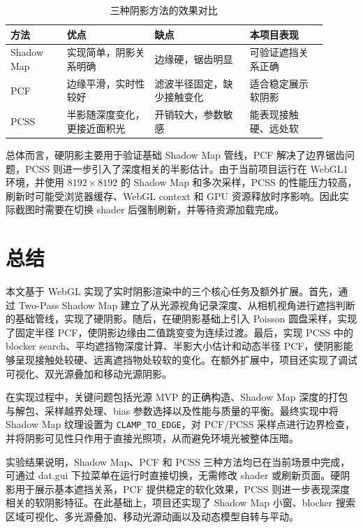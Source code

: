\documentclass{sjtuarticle}
\begin{document}
\begin{table}[htbp]
\centering
\caption{三种阴影方法的效果对比}
\begin{tabular}{p{0.16\linewidth}p{0.25\linewidth}p{0.27\linewidth}p{0.22\linewidth}}
\toprule
方法 & 优点 & 缺点 & 本项目表现 \\
\midrule
Shadow Map & 实现简单，阴影关系明确 & 边缘硬，锯齿明显 & 可验证遮挡关系正确 \\
PCF & 边缘平滑，实时性较好 & 滤波半径固定，缺少接触变化 & 适合稳定展示软阴影 \\
PCSS & 半影随深度变化，更接近面积光 & 开销较大，参数敏感 & 能表现接触硬、远处软 \\
\bottomrule
\end{tabular}
\end{table}

总体而言，硬阴影主要用于验证基础 Shadow Map 管线，PCF 解决了边界锯齿问题，PCSS 则进一步引入了深度相关的半影估计。由于当前项目运行在 WebGL1 环境，并使用 \(8192 \times 8192\) 的 Shadow Map 和多次采样，PCSS 的性能压力较高，刷新时可能受浏览器缓存、WebGL context 和 GPU 资源释放时序影响。因此实际截图时需要在切换 shader 后强制刷新，并等待资源加载完成。

\section{总结}

本文基于 WebGL 实现了实时阴影渲染中的三个核心任务及额外扩展。首先，通过 Two-Pass Shadow Map 建立了从光源视角记录深度、从相机视角进行遮挡判断的基础管线，实现了硬阴影。随后，在硬阴影基础上引入 Poisson 圆盘采样，实现了固定半径 PCF，使阴影边缘由二值跳变变为连续过渡。最后，实现 PCSS 中的 blocker search、平均遮挡物深度计算、半影大小估计和动态半径 PCF，使阴影能够呈现接触处较硬、远离遮挡物处较软的变化。在额外扩展中，项目还实现了调试可视化、双光源叠加和移动光源阴影。

在实现过程中，关键问题包括光源 MVP 的正确构造、Shadow Map 深度的打包与解包、采样越界处理、bias 参数选择以及性能与质量的平衡。最终实现中将 Shadow Map 纹理设置为 \texttt{CLAMP\_TO\_EDGE}，对 PCF/PCSS 采样点进行边界检查，并将阴影可见性只作用于直接光照项，从而避免环境光被整体压暗。

实验结果说明，Shadow Map、PCF 和 PCSS 三种方法均已在当前场景中完成，可通过 dat.gui 下拉菜单在运行时直接切换，无需修改 shader 或刷新页面。硬阴影用于展示基本遮挡关系，PCF 提供稳定的软化效果，PCSS 则进一步表现深度相关的软阴影特征。在此基础上，项目还实现了 Shadow Map 小窗、blocker 搜索区域可视化、多光源叠加、移动光源动画以及动态模型自转与平动。
\end{document}
